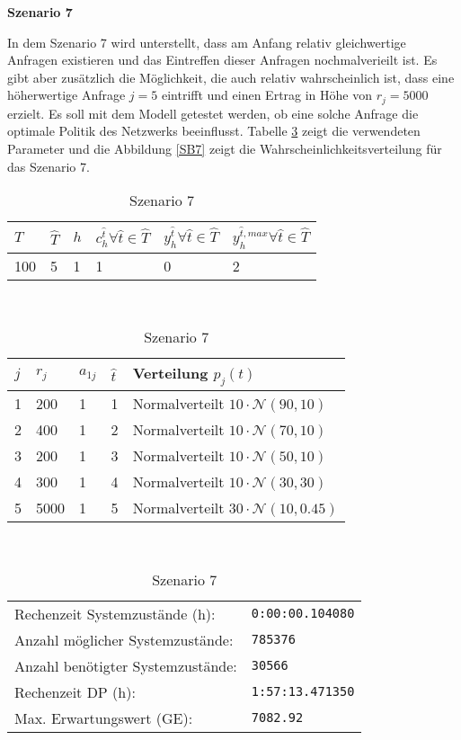 \textbf{Szenario 7}

In dem Szenario 7 wird unterstellt, dass am Anfang relativ gleichwertige Anfragen existieren und das Eintreffen dieser Anfragen nochmalverieilt ist. Es gibt aber zusätzlich die Möglichkeit, die auch relativ wahrscheinlich ist, dass eine höherwertige Anfrage $j=5$ eintrifft und einen Ertrag in Höhe von $r_j=5000$ erzielt. Es soll mit dem Modell getestet werden, ob eine solche Anfrage die optimale Politik des Netzwerks beeinflusst. Tabelle \ref{S7} zeigt die verwendeten Parameter und die Abbildung \ref{SB7} zeigt die Wahrscheinlichkeitsverteilung für das Szenario 7.


\begin{table}[h!]
\renewcommand{\arraystretch}{1.5}
  \begin{center}
    \caption{Szenario 7}  \label{S7}
    \vspace*{3mm}
    \begin{tabular}{l l l l l l}   %
    $T$ & $\hat T$  & $h$ & $c_h^{\hat t}\forall \hat{t}\in{\hat T}$ & $y_h^{\hat t}\forall \hat{t}\in{\hat T}$  & $y_h^{{\hat t},max}\forall \hat{t}\in{\hat T}$  \\  \hline
100 & 5 & 1 & 1 & 0 & 2  \\ \hline
    \end{tabular} \\[3mm]
        \begin{tabular}{p{1cm} p{1cm} p{1cm}  p{1cm} p{6cm}}   %
    $j$ & $r_j$  & $a_{1j}$ & $\hat t$ & Verteilung $p_j(t)$ \\  \hline
1 & 200 & 1 & 1 & Normalverteilt $10\cdot\mathcal{N}(90, 10)$   \\
2 & 400 & 1 & 2 & Normalverteilt $10\cdot\mathcal{N}(70, 10)$  \\
3 & 200 & 1 & 3 & Normalverteilt $10\cdot\mathcal{N}(50, 10)$  \\
4 & 300 & 1 & 4 & Normalverteilt $10\cdot\mathcal{N}(30, 30)$  \\
5 & 5000 & 1 & 5 & Normalverteilt $30\cdot\mathcal{N}(10, 0.45)$ \\
\hline
    \end{tabular} \\[3mm]
     \begin{tabular}{p{7cm}p{5cm}} \hline
     Rechenzeit Systemzustände (h): & \texttt{0:00:00.104080} \\
     Anzahl möglicher Systemzustände: & \texttt{785376} \\
     Anzahl benötigter Systemzustände: & \texttt{30566} \\ 
     Rechenzeit DP (h): & \texttt{1:57:13.471350} \\ 
          Max. Erwartungswert (GE): & \texttt{7082.92} \\ \hline
         \end{tabular} \\[3mm]
  \end{center}
\end{table}


